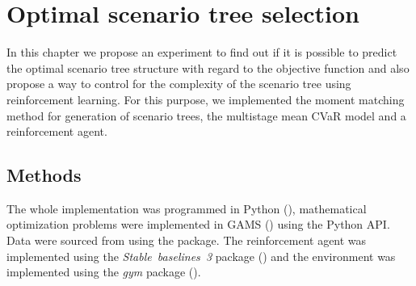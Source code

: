 \chapter{Optimal scenario tree selection}
\label{chapter4}
In this chapter we propose an experiment to find out if it is possible to predict the optimal scenario tree structure with regard to the objective function and also propose a way to control for the complexity of the scenario tree using reinforcement learning. For this purpose, we implemented the moment matching method for generation of scenario trees, the multistage mean CVaR model and a reinforcement agent.
\section{Methods}
The whole implementation was programmed in Python (\cite[Version 3.11]{python}), mathematical optimization problems were implemented in GAMS (\cite[version 40.3.0]{GAMS}) using the Python API. Data were sourced from \cite{yahoo} using the \cite[version 0.1.74]{yfinance} package. The reinforcement agent was implemented using the \textit{Stable~baselines~3} package (\cite[version 1.6.2]{stable_baselines3}) and the environment was implemented using the \textit{gym} package (\cite[version 0.21.0]{openai_gym}).

